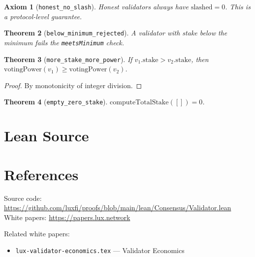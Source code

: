 \documentclass[11pt]{article}
\newtheorem{theorem}{Theorem}
\newtheorem{axiom_stmt}[theorem]{Axiom}
\begin{document}
\begin{axiom_stmt}[\texttt{honest\_no\_slash}]
Honest validators always have $\text{slashed} = 0$. This is a protocol-level guarantee.
\end{axiom_stmt}

\begin{theorem}[\texttt{below\_minimum\_rejected}]
A validator with stake below the minimum fails the \texttt{meetsMinimum} check.
\end{theorem}

\begin{theorem}[\texttt{more\_stake\_more\_power}]
If $v_1.\text{stake} > v_2.\text{stake}$, then $\text{votingPower}(v_1) \geq \text{votingPower}(v_2)$.
\end{theorem}
\begin{proof}
By monotonicity of integer division.
\end{proof}

\begin{theorem}[\texttt{empty\_zero\_stake}]
$\text{computeTotalStake}([]) = 0$.
\end{theorem}


\section{Lean Source}


\section{References}
\noindent Source code: \url{https://github.com/luxfi/proofs/blob/main/lean/Consensus/Validator.lean}\\
\noindent White papers: \url{https://papers.lux.network}

\noindent Related white papers:
\begin{itemize}
  \item \texttt{lux-validator-economics.tex} --- Validator Economics
\end{itemize}
\end{document}
